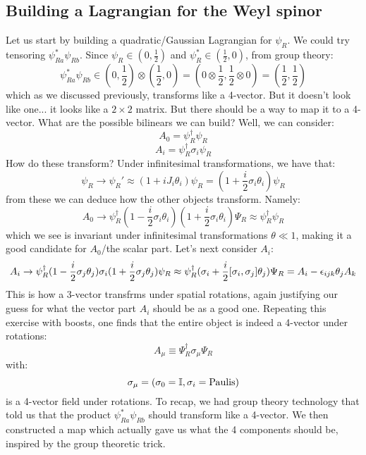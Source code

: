 \subsection{Building a Lagrangian for the Weyl spinor}
Let us start by building a quadratic/Gaussian Lagrangian for $\psi_R$. We could try tensoring $\psi^*_{Ra}\psi_{Rb}$. Since $\psi_R \in (0, \frac{1}{2})$ and $\psi_R^* \in (\frac{1}{2}, 0)$, from group theory:
\begin{equation}
    \psi^*_{Ra}\psi_{Rb} \in (0, \frac{1}{2}) \otimes (\frac{1}{2}, 0) = (0 \otimes \frac{1}{2}, \frac{1}{2}\otimes 0) = (\frac{1}{2}, \frac{1}{2})
\end{equation}
which as we discussed previously, transforms like a 4-vector. But it doesn't look like one... it looks like a $2\times 2$ matrix. But there should be a way to map it to a 4-vector. What are the possible bilinears we can build? Well, we can consider:
\begin{equation}
    A_0 = \psi_R^\dagger \psi_R
\end{equation}
\begin{equation}
    A_i = \psi_R^\dagger \sigma_i \psi_R
\end{equation}
How do these transform? Under infinitesimal transformations, we have that:
\begin{equation}
    \psi_R \to \psi_R' \approx (1  +iJ_i \theta_i)\psi_R = (1 + \frac{i}{2}\sigma_i\theta_i)\psi_R
\end{equation}
from these we can deduce how the other objects transform. Namely:
\begin{equation}
    A_0 \to \psi_R^\dagger(1 - \frac{i}{2}\sigma_i \theta_i)(1 + \frac{i}{2}\sigma_i \theta_i)\Psi_R \approx \psi_R^\dagger \psi_R
\end{equation}
which we see is invariant under infinitesimal transformations $\theta \ll 1$, making it a good candidate for $A_0$/the scalar part. Let's next consider $A_i$:
\begin{equation}
    A_i \to \psi_R^\dagger (1 - \frac{i}{2}\sigma_j\theta_j)\sigma_i(1 + \frac{i}{2}\sigma_j\theta_j)\psi_R \approx \psi_R^\dagger(\sigma_i + \frac{i}{2}[\sigma_i, \sigma_j]\theta_j)\Psi_R = A_i - \epsilon_{ijk}\theta_jA_k
\end{equation}
This is how a 3-vector transfrms under spatial rotations, again justifying our guess for what the vector part $A_i$ should be as a good one. Repeating this exercise with boosts, one finds that the entire object is indeed a 4-vector under rotations:
\begin{equation}
    A_\mu \equiv \Psi_R^\dagger \sigma_\mu \Psi_R
\end{equation}
with:
\begin{equation}
    \sigma_\mu = (\sigma_0 = \mathbb{I}, \sigma_i = \text{Paulis})
\end{equation}
is a 4-vector field under rotations. To recap, we had group theory technology that told us that the product $\psi^*_{Ra}\psi_{Rb}$ should transform like a 4-vector. We then constructed a map which actually gave us what the 4 components should be, inspired by the group theoretic trick.

